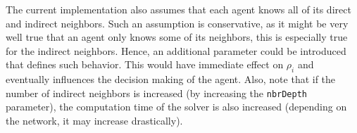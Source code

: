 The current implementation also assumes that each agent knows all of its direct
and indirect neighbors.  Such an assumption is conservative, as it might be
very well true that an agent only knows some of its neighbors, this is
especially true for the indirect neighbors.  Hence, an additional parameter
could be introduced that defines such behavior.  This would have immediate
effect on $\rho_i$ and eventually influences the decision making of the agent.
Also, note that if the number of indirect neighbors is increased (by increasing
the \texttt{nbrDepth} parameter), the computation time of the solver is also
increased (depending on the network, it may increase drastically).



